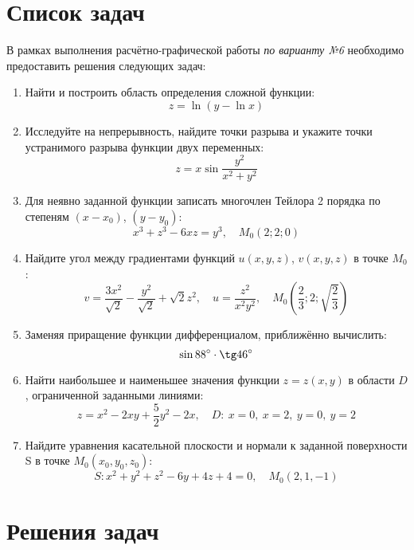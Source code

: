 \section{Список задач}

В рамках выполнения расчётно-графической работы \textit{по варианту №6} необходимо предоставить решения следующих задач:

\begin{enumerate}
  \item Найти и построить область определения сложной функции:
    \[
      z = \ln(y - \ln x)
    \]
  \item Исследуйте на непрерывность, найдите точки разрыва и укажите точки устранимого разрыва функции двух переменных:
    \[
      z = x \sin\frac{y^2}{x^2 + y^2}
    \]
  \item Для неявно заданной функции записать многочлен Тейлора 2 порядка по степеням \( (x-x_0) \), \( (y-y_0) \):
    \[
      x^3+z^3-6xz=y^3, \quad M_0(2;2;0)
    \]
  \item Найдите угол между градиентами функций \( u(x,y,z) \), \( v(x,y,z) \) в точке \( M_0 \):
    \[
      v = \frac{3x^2}{\sqrt{2}} - \frac{y^2}{\sqrt{2}} + \sqrt{2}z^{2},
      \quad u = \frac{z^2}{x^2y^2},
      \quad M_0\left(\frac{2}{3};2;\sqrt{\frac{2}{3}}\right)
    \]
  \item Заменяя приращение функции дифференциалом, приближённо вычислить:
    \[
      \sin 88^{\circ}\cdot\tg 46^{\circ}
    \]

  \item Найти наибольшее и наименьшее значения функции \( z = z(x, y) \) в области \( D \), ограниченной заданными линиями:
    \[
      z = x^{2} - 2xy + \frac{5}{2}y^2 - 2x,
      \quad D:\ x=0,\ x=2,\ y=0,\ y=2
    \]

  \item Найдите уравнения касательной плоскости и нормали к заданной поверхности S в точке \( M_0(x_0, y_0, z_0) \):
    \[
      S\colon x^2 + y^2 + z^2 - 6y + 4z + 4=0, \quad M_0(2,1,-1)
    \]
\end{enumerate}

\newpage

\section{Решения задач}







